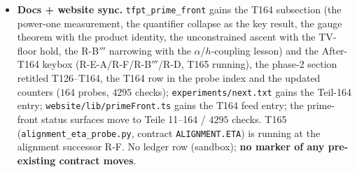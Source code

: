 \documentclass[11pt]{article}
\begin{document}
\begin{itemize}[leftmargin=1.5em]
$2\kappa/\|C\|_\infty$ at bounded price? No sector, no normalisation, no
prime. Stress: the uniform surrogate breaks by
$1.5\times10^{3}$--$4.9\times10^{7}$, the T145 no-go staircase is monotone
($1.0\to9.1\to25.4\to129\to434$, exact null control at $\nu=4$, damage
$\ge26.1$ at the coarsest setting on every window), the gauge break is
$3.4\times10^{-2}$, Dirichlet/parity/orthonormality controls
$\le2\times10^{-14}$, and the random-$v$ pairing identity holds to
$3.8\times10^{-16}$. Balance $11$ THEOREM / $1$ CERT-UNIF / $4$ CERT-WINDOW /
$6$ MEASURED, zero load-bearing fit rows; candidates T164-Q1\ldots Q9 all
\textsc{pending} (no promotion --- to be bundled with T165). NOT RH evidence;
no marker moves.
\item \textbf{Docs + website sync.} \texttt{tfpt\_prime\_front} gains the T164
subsection (the power-one measurement, the quantifier collapse as the key
result, the gauge theorem with the product identity, the unconstrained ascent
with the TV-floor hold, the R-B$'''$ narrowing with the $\alpha$/$h$-coupling
lesson) and the After-T164 keybox (R-E-A/R-F/R-B$'''$/R-D, T165 running), the
phase-2 section retitled T126--T164, the T164 row in the probe index and the
updated counters ($164$ probes, $4295$ checks);
\texttt{experiments/next.txt} gains the Teil-164 entry;
\texttt{website/lib/primeFront.ts} gains the T164 feed entry; the prime-front
status surfaces move to Teile 11--164 / $4295$ checks. T165
(\texttt{alignment\_eta\_probe.py}, contract \texttt{ALIGNMENT.ETA}) is
running at the alignment successor R-F. No ledger row (sandbox);
\textbf{no marker of any pre-existing contract moves}.
\end{itemize}
\end{document}
